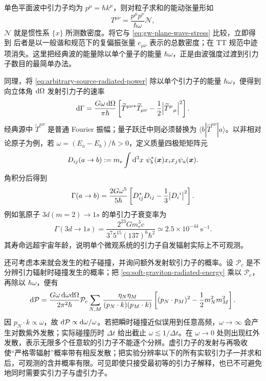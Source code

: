单色平面波中引力子均为 $p^\mu=\hbar k^\mu$，则对粒子求和的能动张量形如
\[
    T^{\mu\nu} = \frac{p^\mu p^\nu}{\hbar\omega} \mathscr N,
\]
$\mathscr N$ 就是惯性系 $\{x\}$ 所测数密度。将它与 \eqref{eq:gw-plane-wave-stress} 比较，立即得到
后者是以一般谐和规范下的复偏振张量 $e_{\mu\nu}$ 表示的总数密度；在 TT 规范中迹项消失。这里把经典波的能量除以单个量子的能量 $\hbar\omega$，正是由波强度过渡到引力子数目的最简单办法。

同理，将 \eqref{eq:arbitrary-source-radiated-power} 除以单个引力子的能量 $\hbar\omega$，便得到向立体角 $\dd\Omega$ 发射引力子的速率
\begin{equation}
    \dd\Gamma=\frac{G\omega\,\dd\Omega}{\pi\hbar}
    \left[\widetilde T^{\mu\nu *}\widetilde T_{\mu\nu}
    -\frac12\abs{\widetilde T^\mu{}_\mu}^2\right].
\end{equation}
经典源中 $\widetilde T^{\mu\nu}$ 是普通 Fourier 振幅；量子跃迁中则必须替换为 $\langle b|\widehat T^{\mu\nu}|a\rangle$。以非相对论原子为例，若 $\omega=(E_a-E_b)/\hbar>0$，定义质量四极矩矩阵元
\[
    D_{ij}(a\to b):=m_e\int\dd[3]{x}\,\psi_b^*(\bm x)x_i x_j\psi_a(\bm x).
\]
角积分后得到
\[
    \Gamma(a\to b)=\frac{2G\omega^5}{5\hbar}
    \left[D_{ij}^*D_{ij}-\frac13\abs{D_i{}^i}^2\right].
\]
例如氢原子 $3d(m=2)\to1s$ 的单引力子衰变率为
\[
    \Gamma(3d\to1s)
    =\frac{2^{23}Gm_e^3c}{3^7 5^{15}(137)^6\hbar^2}
    \simeq2.5\times10^{-44}\ \mathrm{s}^{-1}.
\]
其寿命远超宇宙年龄，说明单个微观系统的引力子自发辐射实际上不可观测。

还可考虑本来就会发生的粒子碰撞，并询问额外发射软引力子的概率。设 $\mathcal P_c$ 是不分辨引力辐射时碰撞发生的概率；把 \eqref{eq:soft-graviton-radiated-energy} 乘以 $\mathcal P_c$，再除以 $\hbar\omega$，便有
\begin{equation}
    \dd\mathcal P=\frac{G\omega\,\dd\omega\dd\Omega}{2\pi^2\hbar}\mathcal P_c
    \sum_{N,M}\frac{\eta_N\eta_M}{(p_N\cdot k)(p_M\cdot k)}
    \left[(p_N\cdot p_M)^2-\frac12m_N^2m_M^2\right].
\end{equation}
因 $p_N\cdot k\propto\omega$，故 $\dd\mathcal P\propto\dd\omega/\omega$。若把瞬时碰撞近似误用到任意高频，$\omega\to\infty$ 会产生对数紫外发散；实际碰撞历时 $\Delta t$ 给出截止 $\omega\lesssim1/\Delta t$。在 $\omega\to0$ 处则出现红外发散，表示无限多个任意软的引力子不能逐个分辨。虚引力子的发射与再吸收使“严格零辐射”概率带有相反发散；把实验分辨率以下的所有实软引力子一并求和后，可观测的含并概率有限。可见即使只接受最初等的引力子解释，也已不可避免地同时需要实引力子与虚引力子。

